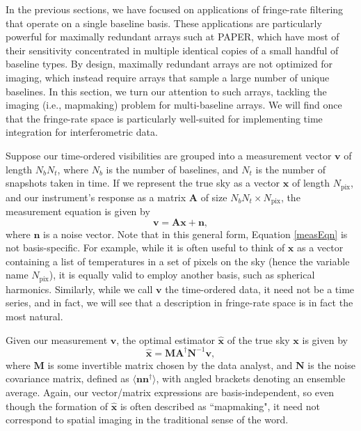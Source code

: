 \documentclass[twocolumn,apj,numberedappendix]{emulateapj}
\newcommand{\vis}{\mathbf{v}}
\newcommand{\x}{\mathbf{x}}
\newcommand{\xhat}{\hat{\mathbf{x}}}
\newcommand{\A}{\mathbf{A}}
\newcommand{\N}{\mathbf{N}}
\begin{document}
In the previous sections, we have focused on applications of fringe-rate filtering that operate on a single baseline basis. These applications are particularly powerful for maximally redundant arrays such at PAPER, which have most of their sensitivity concentrated in multiple identical copies of a small handful of baseline types. By design, maximally redundant arrays are not optimized for imaging, which instead require arrays that sample a large number of unique baselines. In this section, we turn our attention to such arrays, tackling the imaging (i.e., mapmaking) problem for multi-baseline arrays. We will find once that the fringe-rate space is particularly well-suited for implementing time integration for interferometric data.


Suppose our time-ordered visibilities are grouped into a measurement vector
$\vis$ of length $N_b N_t$, where $N_b$ is the number of baselines, and $N_t$
is the number of snapshots taken in time.  If we represent the true sky as a
vector $\x$ of length $N_\textrm{pix}$, and our instrument's response as a
matrix $\A$ of size $N_b N_t \times N_\textrm{pix}$, the measurement equation
is given by
\begin{equation}
\label{measEqn}
\vis = \A \x + \mathbf{n},
\end{equation}
where $\mathbf{n}$ is a noise vector.  Note that in this general form, Equation
\eqref{measEqn} is not basis-specific.  For example, while it is often useful
to think of $\x$ as a vector containing a list of temperatures in a set of
pixels on the sky (hence the variable name $N_\textrm{pix}$), it is equally
valid to employ another basis, such as spherical harmonics.  Similarly, while
we call $\vis$ the time-ordered data, it need not be a time series, and in
fact, we will see that a description in fringe-rate space is in fact the most natural.

Given our measurement $\vis$, the optimal estimator $\xhat$ of the true sky
$\x$ is given by \citep{T97mapmaking,Morales2009,dillon_et_al2015}
\begin{equation}
\label{optEst}
\xhat = \mathbf{M} \A^\dagger \N^{-1} \vis,
\end{equation}
where $\mathbf{M}$ is some invertible matrix chosen by the data analyst, and
$\N$ is the noise covariance matrix, defined as $\langle \mathbf{n}
\mathbf{n}^\dagger \rangle$, with angled brackets denoting an ensemble average.
Again, our vector/matrix expressions are basis-independent, so even though the
formation of $\xhat$ is often described as ``mapmaking", it need not correspond
to spatial imaging in the traditional sense of the word.
\end{document}
